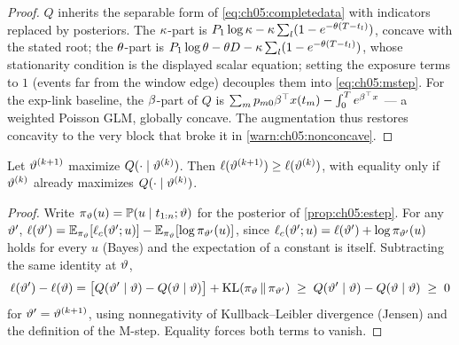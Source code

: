 \begin{proof}
$Q$ inherits the separable form of \cref{eq:ch05:completedata} with
indicators replaced by posteriors. The $\kappa$-part is $P_1\log\kappa -
\kappa\sum_l(1-e^{-\theta(T-t_l)})$, concave with the stated root;
the $\theta$-part is $P_1\log\theta - \theta D - \kappa\sum_l(1 -
e^{-\theta(T-t_l)})$, whose stationarity condition is the displayed
scalar equation; setting the exposure terms to $1$ (events far from the
window edge) decouples them into \cref{eq:ch05:mstep}. For the
exp-link baseline, the $\beta$-part of $Q$ is $\sum_m p_{m0}
\beta^\top x(t_m) - \int_0^{T} e^{\beta^\top x}$ --- a
weighted Poisson GLM, globally concave. The augmentation thus restores
concavity to the very block that broke it in
\cref{warn:ch05:nonconcave}.
\end{proof}

\begin{theorem}\label{thm:ch05:emascent}
Let $\vartheta^{(k+1)}$ maximize $Q(\cdot \mid \vartheta^{(k)})$. Then
$\ell(\vartheta^{(k+1)}) \ge \ell(\vartheta^{(k)})$, with
equality only if $\vartheta^{(k)}$ already maximizes $Q(\cdot \mid
\vartheta^{(k)})$.
\end{theorem}

\begin{proof}
Write $\pi_{\vartheta}(u) = \mathbb{P}(u \mid t_{1:n}; \vartheta)$ for the
posterior of \cref{prop:ch05:estep}. For any $\vartheta'$,
$\ell(\vartheta') = \mathbb{E}_{\pi_{\vartheta}}[\ell_c(\vartheta';
u)] - \mathbb{E}_{\pi_{\vartheta}}[\log \pi_{\vartheta'}(u)]$, since
$\ell_c(\vartheta';u) = \ell(\vartheta') + \log
\pi_{\vartheta'}(u)$ holds for every $u$ (Bayes) and the expectation of
a constant is itself. Subtracting the same identity at $\vartheta$,
\[
\ell(\vartheta') - \ell(\vartheta)
=
\big[Q(\vartheta' \mid \vartheta) - Q(\vartheta \mid \vartheta)\big]
+ \operatorname{KL}\!\left(\pi_{\vartheta} \,\middle\|\, \pi_{\vartheta'}\right)
\;\ge\;
Q(\vartheta' \mid \vartheta) - Q(\vartheta \mid \vartheta)
\;\ge\; 0
\]
for $\vartheta' = \vartheta^{(k+1)}$, using nonnegativity of
Kullback--Leibler divergence (Jensen) and the definition of the M-step.
Equality forces both terms to vanish.
\end{proof}

